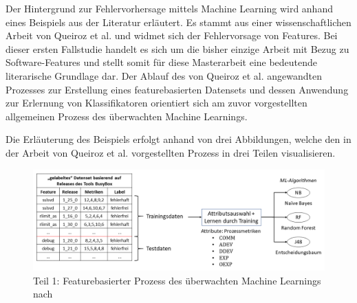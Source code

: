 Der Hintergrund zur Fehlervorhersage mittels Machine Learning wird anhand eines Beispiels aus der Literatur erläutert. Es stammt aus einer wissenschaftlichen Arbeit von Queiroz et al. \cite{Queiroz2016} und widmet sich der Fehlervorsage von Features. Bei dieser ersten Fallstudie handelt es sich um die bisher einzige Arbeit mit Bezug zu Software-Features und stellt somit für diese Masterarbeit eine bedeutende literarische Grundlage dar. Der Ablauf des von Queiroz et al. angewandten Prozesses zur Erstellung eines featurebasierten Datensets und dessen Anwendung zur Erlernung von Klassifikatoren orientiert sich am zuvor vorgestellten allgemeinen Prozess des überwachten Machine Learnings.

Die Erläuterung des Beispiels erfolgt anhand von drei Abbildungen, welche den in der Arbeit von Queiroz et al. vorgestellten Prozess in drei Teilen visualisieren. 

\begin{figure}[H]
    \centering
    \captionsetup{justification=centering}
    \includegraphics[width=\textwidth]{images/ML1}
    \caption{Teil 1: Featurebasierter Prozess des überwachten Machine Learnings nach \cite{Queiroz2016}}\label{fig:ml1}
\end{figure}

